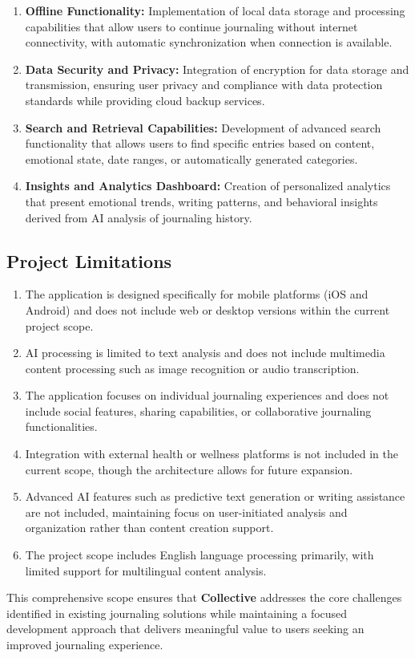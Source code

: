 \begin{enumerate}
	\item \textbf{Offline Functionality:} Implementation of local data storage and processing capabilities that allow users to continue journaling without internet connectivity, with automatic synchronization when connection is available.
	
	\item \textbf{Data Security and Privacy:} Integration of encryption for data storage and transmission, ensuring user privacy and compliance with data protection standards while providing cloud backup services.
	
	\item \textbf{Search and Retrieval Capabilities:} Development of advanced search functionality that allows users to find specific entries based on content, emotional state, date ranges, or automatically generated categories.
	
	\item \textbf{Insights and Analytics Dashboard:} Creation of personalized analytics that present emotional trends, writing patterns, and behavioral insights derived from AI analysis of journaling history.
\end{enumerate}

\subsection{Project Limitations}\label{subsec:limitations}

\begin{enumerate}
	\item The application is designed specifically for mobile platforms (iOS and Android) and does not include web or desktop versions within the current project scope.
	
	\item AI processing is limited to text analysis and does not include multimedia content processing such as image recognition or audio transcription.
	
	\item The application focuses on individual journaling experiences and does not include social features, sharing capabilities, or collaborative journaling functionalities.
	
	\item Integration with external health or wellness platforms is not included in the current scope, though the architecture allows for future expansion.
	
	\item Advanced AI features such as predictive text generation or writing assistance are not included, maintaining focus on user-initiated analysis and organization rather than content creation support.
	
	\item The project scope includes English language processing primarily, with limited support for multilingual content analysis.
\end{enumerate}

This comprehensive scope ensures that \textbf{Collective} addresses the core challenges identified in existing journaling solutions while maintaining a focused development approach that delivers meaningful value to users seeking an improved journaling experience.
